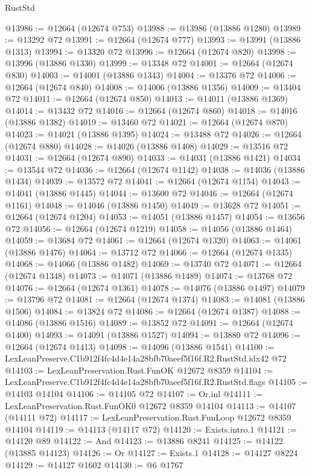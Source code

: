 \begin{lexlean}{RustStd}
\begin{coremodule}
@13986 := @12664 (@12674 @753)
@13988 := @13986 (@13886 @1280)
@13989 := @13292 @72
@13991 := @12664 (@12674 @777)
@13993 := @13991 (@13886 @1313)
@13994 := @13320 @72
@13996 := @12664 (@12674 @820)
@13998 := @13996 (@13886 @1330)
@13999 := @13348 @72
@14001 := @12664 (@12674 @830)
@14003 := @14001 (@13886 @1343)
@14004 := @13376 @72
@14006 := @12664 (@12674 @840)
@14008 := @14006 (@13886 @1356)
@14009 := @13404 @72
@14011 := @12664 (@12674 @850)
@14013 := @14011 (@13886 @1369)
@14014 := @13432 @72
@14016 := @12664 (@12674 @860)
@14018 := @14016 (@13886 @1382)
@14019 := @13460 @72
@14021 := @12664 (@12674 @870)
@14023 := @14021 (@13886 @1395)
@14024 := @13488 @72
@14026 := @12664 (@12674 @880)
@14028 := @14026 (@13886 @1408)
@14029 := @13516 @72
@14031 := @12664 (@12674 @890)
@14033 := @14031 (@13886 @1421)
@14034 := @13544 @72
@14036 := @12664 (@12674 @1142)
@14038 := @14036 (@13886 @1434)
@14039 := @13572 @72
@14041 := @12664 (@12674 @1154)
@14043 := @14041 (@13886 @1445)
@14044 := @13600 @72
@14046 := @12664 (@12674 @1161)
@14048 := @14046 (@13886 @1450)
@14049 := @13628 @72
@14051 := @12664 (@12674 @1204)
@14053 := @14051 (@13886 @1457)
@14054 := @13656 @72
@14056 := @12664 (@12674 @1219)
@14058 := @14056 (@13886 @1464)
@14059 := @13684 @72
@14061 := @12664 (@12674 @1320)
@14063 := @14061 (@13886 @1476)
@14064 := @13712 @72
@14066 := @12664 (@12674 @1335)
@14068 := @14066 (@13886 @1482)
@14069 := @13740 @72
@14071 := @12664 (@12674 @1348)
@14073 := @14071 (@13886 @1489)
@14074 := @13768 @72
@14076 := @12664 (@12674 @1361)
@14078 := @14076 (@13886 @1497)
@14079 := @13796 @72
@14081 := @12664 (@12674 @1374)
@14083 := @14081 (@13886 @1506)
@14084 := @13824 @72
@14086 := @12664 (@12674 @1387)
@14088 := @14086 (@13886 @1516)
@14089 := @13852 @72
@14091 := @12664 (@12674 @1400)
@14093 := @14091 (@13886 @1527)
@14094 := @13880 @72
@14096 := @12664 (@12674 @1413)
@14098 := @14096 (@13886 @1541)
@14100 := LexLeanPreserve.C1b912f4fc4d4e14a28bfb70aeef5f16f.R2.RustStd.idx42 @72
@14103 := LexLeanPreservation.Rust.FunOK @12672 @8359
@14104 := LexLeanPreserve.C1b912f4fc4d4e14a28bfb70aeef5f16f.R2.RustStd.flags
@14105 := @14103 @14104
@14106 := @14105 @72
@14107 := Or.inl
@14111 := LexLeanPreservation.Rust.FunOK0 @12672 @8359 @14104
@14113 := @14107 (@14111 @72)
@14117 := LexLeanPreservation.Rust.FunLoop @12672 @8359 @14104
@14119 := @14113 (@14117 @72)
@14120 := Exists.intro.{1}
@14121 := @14120 @89
@14122 := And
@14123 := @13886 @8241
@14125 := @14122 (@13885 @14123)
@14126 := Or
@14127 := Exists.{1}
@14128 := @14127 @8224
@14129 := @14127 @1602
@14130 := @6 @1767

\end{coremodule}
\end{lexlean}
